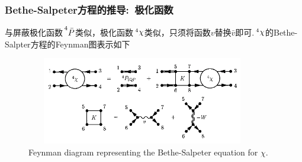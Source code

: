 {\frame
{
	\frametitle{\textrm{Bethe-Salpeter}方程的推导:~极化函数}
	与屏蔽极化函数$\sideset{^4}{}{\mathop{\bar{P}}}$类似，极化函数$\sideset{^4}{}{\mathop{\chi}}$类似，只须将函数$v$替换$\bar{v}$即可.$\sideset{^4}{}{\mathop{\chi}}$的\textrm{Bethe-Salpter}方程的\textrm{Feynman}图表示如下
\begin{figure}[h!]
\centering
\includegraphics[height=1.5in,width=4.00in,viewport=13 15 633 260,clip]{Figures/BSE_Feynman.png}
\caption{\textrm{\tiny Feynman diagram representing the Bethe-Salpeter equation for $\chi$.}}%
\label{chi-BSE_solution}
\end{figure}
}

}
